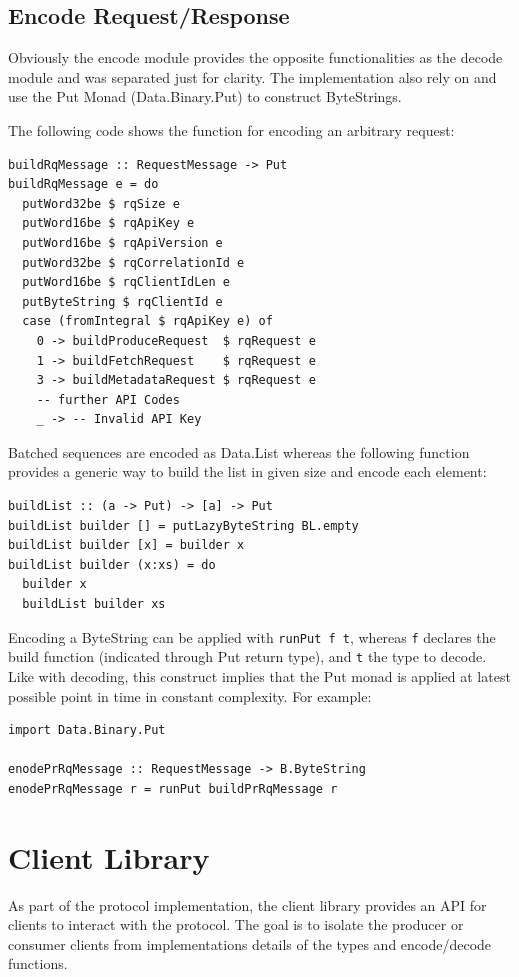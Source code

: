\subsection{Encode Request/Response}
\label{sec:impl-prot-encoding}
Obviously the encode module provides the opposite functionalities as the decode
module and was separated just for clarity. The implementation also rely on
and use the Put Monad (Data.Binary.Put) to construct ByteStrings.

The following code shows the function for encoding an arbitrary request:
\begin{lstlisting}
buildRqMessage :: RequestMessage -> Put
buildRqMessage e = do
  putWord32be $ rqSize e
  putWord16be $ rqApiKey e
  putWord16be $ rqApiVersion e
  putWord32be $ rqCorrelationId e
  putWord16be $ rqClientIdLen e
  putByteString $ rqClientId e
  case (fromIntegral $ rqApiKey e) of
    0 -> buildProduceRequest  $ rqRequest e
    1 -> buildFetchRequest    $ rqRequest e
    3 -> buildMetadataRequest $ rqRequest e
    -- further API Codes 
    _ -> -- Invalid API Key 
\end{lstlisting}

Batched sequences are encoded as Data.List whereas the following function
provides a generic way to build the list in given size and encode each element:
\begin{lstlisting}
buildList :: (a -> Put) -> [a] -> Put
buildList builder [] = putLazyByteString BL.empty
buildList builder [x] = builder x
buildList builder (x:xs) = do 
  builder x
  buildList builder xs
\end{lstlisting}

Encoding a ByteString can be applied with \lstinline{runPut f t}, whereas
\lstinline{f} declares the build function (indicated through Put return type),
and  \lstinline{t} the type to decode. Like with decoding, this construct
implies that the Put monad is applied at latest possible point in time in
constant complexity. For example: 
\begin{lstlisting}
import Data.Binary.Put

enodePrRqMessage :: RequestMessage -> B.ByteString
enodePrRqMessage r = runPut buildPrRqMessage r
\end{lstlisting}

\section{Client Library}
\label{sec:impl-prot-client}
As part of the protocol implementation, the client library provides an
API for clients to interact with the protocol. The goal is to isolate the
producer or consumer clients from implementations details of the types and
encode/decode functions. 

